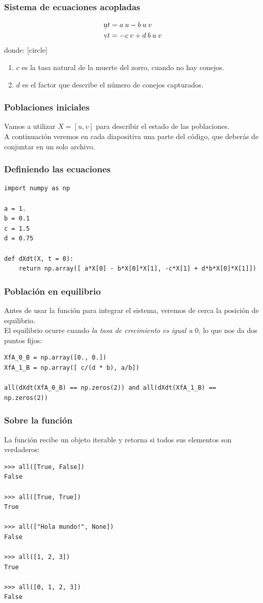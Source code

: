\begin{frame}
\frametitle{Sistema de ecuaciones acopladas}
\begin{align*}
\d{u}{t} &= a \: u - b \: u \: v \\
\d{v}{t} &= -c \: v + d \: b\: u\: v
\end{align*}
donde:
[circle]
\begin{enumerate}[<+->]
\conti
\item $c$ es la tasa natural de la muerte del zorro, cuando no hay conejos.
\item $d$ es el factor que describe el número de conejos capturados.
\end{enumerate}
\end{frame}
\begin{frame}
\frametitle{Poblaciones iniciales}
Vamos a utilizar $X = [u, v]$ para describir el estado de las poblaciones.
\\
\bigskip
A continuación veremos en cada diapositiva una parte del código, que deberás de conjuntar en un solo archivo.
\end{frame}
\begin{frame}
\frametitle{Definiendo las ecuaciones}
\begin{lstlisting}[caption=Código inicial, style=codigopython]
import numpy as np

a = 1.
b = 0.1
c = 1.5
d = 0.75

def dXdt(X, t = 0):
    return np.array([ a*X[0] - b*X[0]*X[1], -c*X[1] + d*b*X[0]*X[1]])
\end{lstlisting}
\end{frame}
\begin{frame}
\frametitle{Población en equilibrio}
Antes de usar la función  para integrar el sistema, veremos de cerca la posición de equilibrio.
\\
\bigskip
El equilibrio ocurre cuando \emph{la tasa de crecimiento es igual a $0$}, lo que nos da dos puntos fijos:
\begin{lstlisting}[caption=Equilibrio en las poblaciones, style=codigopython]
XfA_0_B = np.array([0., 0.])
XfA_1_B = np.array([ c/(d * b), a/b])

all(dXdt(XfA_0_B) == np.zeros(2)) and all(dXdt(XfA_1_B) == np.zeros(2))
\end{lstlisting}
\end{frame}
\begin{frame}
\frametitle{Sobre la función }
La función  recibe un objeto iterable y retorna  si todos sus elementos son verdaderos:
\begin{verbatim}
>>> all([True, False])
False

>>> all([True, True])
True

>>> all(["Hola mundo!", None])
False

>>> all([1, 2, 3])
True

>>> all([0, 1, 2, 3])
False
\end{verbatim}
\end{frame}
